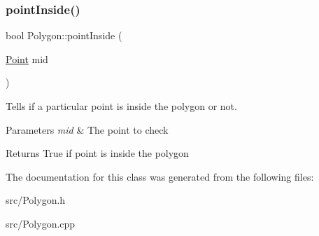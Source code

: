 \subsubsection{\texorpdfstring{point\+Inside()}{pointInside()}}
{\footnotesize\ttfamily bool Polygon\+::point\+Inside (\begin{DoxyParamCaption}\item[{\hyperlink{classPoint}{Point}}]{mid }\end{DoxyParamCaption})}

Tells if a particular point is inside the polygon or not. 
\begin{DoxyParams}{Parameters}
{\em mid} & The point to check \\
\hline
\end{DoxyParams}
\begin{DoxyReturn}{Returns}
True if point is inside the polygon 
\end{DoxyReturn}


The documentation for this class was generated from the following files\+:\begin{DoxyCompactItemize}
\item 
src/Polygon.\+h\item 
src/Polygon.\+cpp\end{DoxyCompactItemize}
